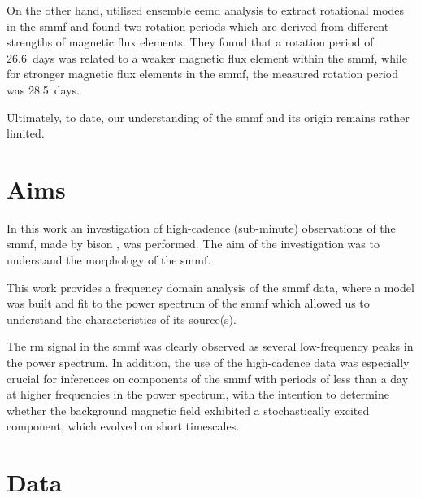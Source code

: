 On the other hand, \citet{xiang_ensemble_2016} utilised ensemble \gls{eemd} analysis to extract rotational modes in the \gls{smmf} and found two rotation periods which are derived from different strengths of magnetic flux elements. They found that a rotation period of 26.6~days was related to a weaker magnetic flux element within the \gls{smmf}, while for stronger magnetic flux elements in the \gls{smmf}, the measured rotation period was 28.5~days.

Ultimately, to date, our understanding of the \gls{smmf} and its origin remains rather limited.


\section{Aims}\label{sec:SMMF_aims}

In this work an investigation of high-cadence (sub-minute) observations of the \gls{smmf}, made by \gls{bison} \citep{chaplin_bison_1996, chaplin_noise_2005, hale_performance_2016}, was performed. The aim of the investigation was to understand the morphology of the \gls{smmf}. 

This work provides a frequency domain analysis of the \gls{smmf} data, where a model was built and fit to the power spectrum of the \gls{smmf} which allowed us to understand the characteristics of its source(s). 

The \gls{rm} signal in the \gls{smmf} was clearly observed as several low-frequency peaks in the power spectrum. In addition, the use of the high-cadence data was especially crucial for inferences on components of the \gls{smmf} with periods of less than a day at higher frequencies in the power spectrum, with the intention to determine whether the background magnetic field exhibited a stochastically excited component, which evolved on short timescales.




\section{Data}\label{sec:SMMF_data}


